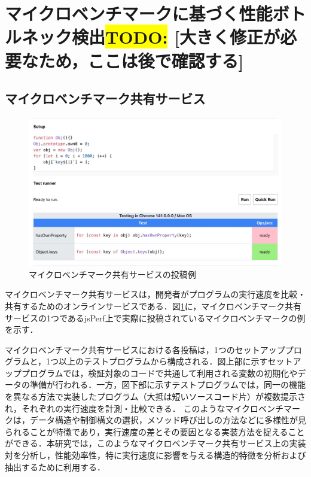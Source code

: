 \documentclass[submit,techrep,noauthor]{ipsj}
\newcommand{\todo}[1]{\colorbox{yellow}{{\bf TODO}:}{\color{red} {\textbf{[#1]}}}}
\begin{document}
\section{マイクロベンチマークに基づく性能ボトルネック検出\todo{大きく修正が必要なため，ここは後で確認する}}
\label{sec:background}

\subsection{マイクロベンチマーク共有サービス}

\begin{figure}[t]
    \centering
    \includegraphics[width=1.0\linewidth]{./Noguchi_fig/jsPerf_example.pdf}
    \caption{マイクロベンチマーク共有サービスの投稿例\protect\footnotemark}
    \label{fig:jsPerf}
\end{figure}


マイクロベンチマーク共有サービスは，開発者がプログラムの実行速度を比較・共有するためのオンラインサービスである．図\ref{fig:jsPerf}に，マイクロベンチマーク共有サービスの1つであるjsPerf上で実際に投稿されているマイクロベンチマークの例を示す．

マイクロベンチマーク共有サービスにおける各投稿は，1つのセットアッププログラムと，1つ以上のテストプログラムから構成される．図上部に示すセットアッププログラムでは，検証対象のコードで共通して利用される変数の初期化やデータの準備が行われる．一方，図下部に示すテストプログラムでは，同一の機能を異なる方法で実装したプログラム（大抵は短いソースコード片）が複数提示され，それぞれの実行速度を計測・比較できる．
このようなマイクロベンチマークは，データ構造や制御構文の選択，メソッド呼び出しの方法などに多様性が見られることが特徴であり，実行速度の差とその要因となる実装方法を捉えることができる．本研究では，このようなマイクロベンチマーク共有サービス上の実装対を分析し，性能効率性，特に実行速度に影響を与える構造的特徴を分析および抽出するために利用する．
\end{document}
